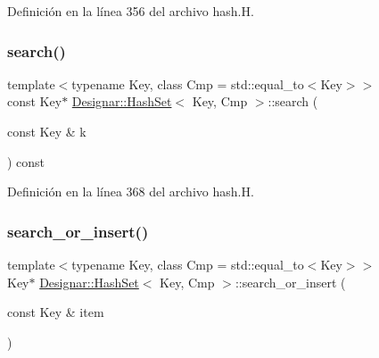 Definición en la línea 356 del archivo hash.\+H.

\mbox{\label{class_designar_1_1_hash_set_a6cd71f72b1676aa364e4aab6687b115b}} 
\subsubsection{\texorpdfstring{search()}{search()}\hspace{0.1cm}{\footnotesize\ttfamily [2/2]}}
{\footnotesize\ttfamily template$<$typename Key, class Cmp = std\+::equal\+\_\+to$<$\+Key$>$$>$ \\
const Key$\ast$ \hyperlink{class_designar_1_1_hash_set}{Designar\+::\+Hash\+Set}$<$ Key, Cmp $>$\+::search (\begin{DoxyParamCaption}\item[{const Key \&}]{k }\end{DoxyParamCaption}) const\hspace{0.3cm}{\ttfamily [inline]}}



Definición en la línea 368 del archivo hash.\+H.

\mbox{\label{class_designar_1_1_hash_set_abb9cb610eed9832735c6f0bcafbb1dea}} 
\subsubsection{\texorpdfstring{search\+\_\+or\+\_\+insert()}{search\_or\_insert()}\hspace{0.1cm}{\footnotesize\ttfamily [1/2]}}
{\footnotesize\ttfamily template$<$typename Key, class Cmp = std\+::equal\+\_\+to$<$\+Key$>$$>$ \\
Key$\ast$ \hyperlink{class_designar_1_1_hash_set}{Designar\+::\+Hash\+Set}$<$ Key, Cmp $>$\+::search\+\_\+or\+\_\+insert (\begin{DoxyParamCaption}\item[{const Key \&}]{item }\end{DoxyParamCaption})\hspace{0.3cm}{\ttfamily [inline]}}



